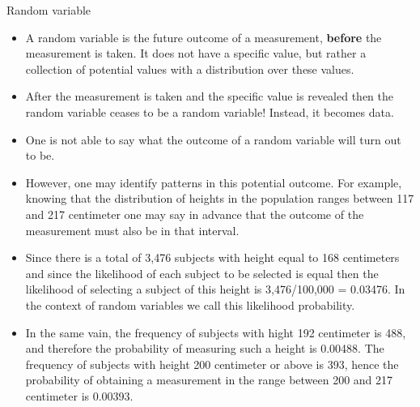 \documentclass[10pt]{beamer}\usepackage[]{graphicx}\usepackage[]{color}
\begin{document}
\begin{frame}[fragile]{Random variable}
	\small
	\begin{itemize}[<+->]
		
		\item A random variable is the future outcome of a measurement, \textbf{before}
		the measurement is taken. It does not have a specific value, but rather
		a collection of potential values with a distribution over these values.
		
		\item After the measurement is taken and the specific value is revealed then
		the random variable ceases to be a random variable! Instead, it becomes
		data.
		
		\item One is not able to say what the outcome of a random variable
		will turn out to be. 
		
		\item However, one may identify patterns in this potential
		outcome. For example, knowing that the distribution of heights in the
		population ranges between 117 and 217 centimeter one may say in advance
		that the outcome of the measurement must also be in that interval.
		
		\item Since there is a total of 3,476 subjects with height equal to
		168 centimeters and since the likelihood of each subject to be selected
		is equal then the likelihood of selecting a subject of this height is
		3,476/100,000 = 0.03476. In the context of random variables we call this
		likelihood probability. 
		
		\item In the same vain, the frequency of subjects
		with hight 192 centimeter is 488, and therefore the probability of
		measuring such a height is 0.00488. The frequency of subjects with
		height 200 centimeter or above is 393, hence the probability of
		obtaining a measurement in the range between 200 and 217 centimeter is
		0.00393.
		
		
	\end{itemize}
	
\end{frame}
\end{document}
